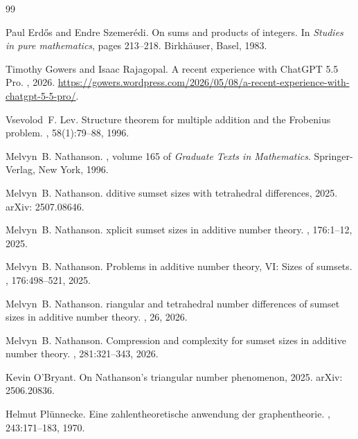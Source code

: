 \documentclass[10pt,a4paper]{article}
\theoremstyle{definition}
\theoremstyle{remark}
\numberwithin{equation}{section}
\numberwithin{theorem}{section}
\begin{document}
\begin{thebibliography}{99}

Paul Erd\H{o}s and Endre Szemer\'edi.
\newblock On sums and products of integers.
\newblock In {\em Studies in pure mathematics}, pages 213--218. Birkh\"auser, Basel, 1983.

Timothy Gowers and Isaac Rajagopal.
\newblock A recent experience with {C}hat{GPT} 5.5 {P}ro.
, 2026.
\newblock \url{https://gowers.wordpress.com/2026/05/08/a-recent-experience-with-chatgpt-5-5-pro/}.

Vsevolod~F. Lev.
\newblock Structure theorem for multiple addition and the {F}robenius problem.
, 58(1):79--88, 1996.

Melvyn~B. Nathanson.
, volume 165 of {\em Graduate Texts in Mathematics}.
\newblock Springer-Verlag, New York, 1996.

Melvyn~B. Nathanson.
dditive sumset sizes with tetrahedral differences, 2025.
\newblock arXiv: 2507.08646.

Melvyn~B. Nathanson.
xplicit sumset sizes in additive number theory.
, 176:1--12, 2025.

Melvyn~B. Nathanson.
\newblock Problems in additive number theory, {VI}: Sizes of sumsets.
, 176:498--521, 2025.

Melvyn~B. Nathanson.
riangular and tetrahedral number differences of sumset sizes in additive number theory.
, 26, 2026.

Melvyn~B. Nathanson.
\newblock Compression and complexity for sumset sizes in additive number theory.
, 281:321--343, 2026.

Kevin O'Bryant.
\newblock On {N}athanson's triangular number phenomenon, 2025.
\newblock arXiv: 2506.20836.

Helmut Pl{\"{u}}nnecke.
\newblock Eine zahlentheoretische anwendung der graphentheorie.
, 243:171--183, 1970.


\end{thebibliography}
\end{document}
